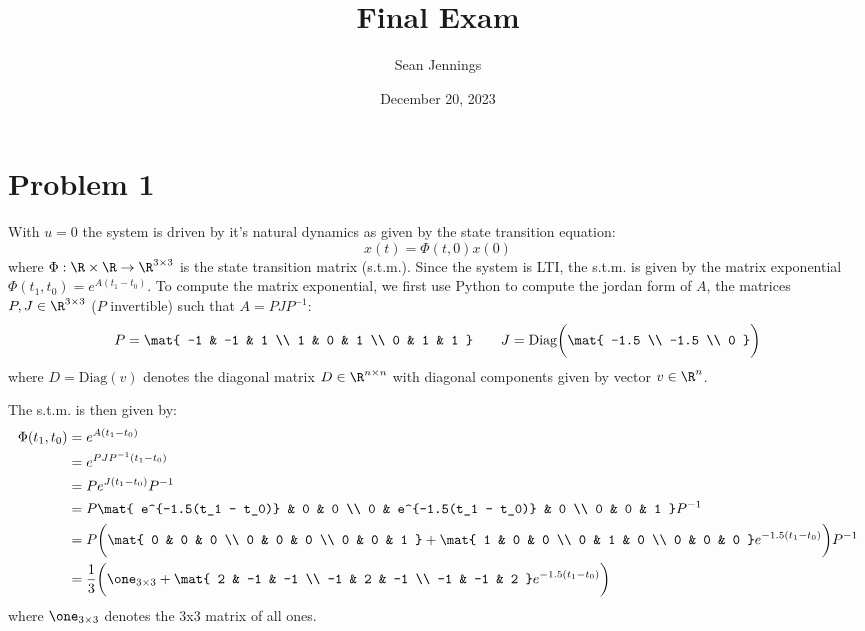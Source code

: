 \documentclass{homework}
\title{Final Exam}
\author{Sean Jennings}
\date{December 20, 2023}
\begin{document}
\maketitle
\newcommand{\control}{\mathcal{C}}

\section{Problem 1}
\begin{letterenum}
\item With $u=0$ the system is driven by it's natural dynamics as given by the state transition equation:
\begin{equation}
    x(t) = \Phi(t, 0) x(0)
    \label{eq:natural-dyn}
\end{equation}
where $\Phi: \R \times \R \to \R^{3 \times 3}$ is the state transition matrix (s.t.m.). Since the system
is LTI, the s.t.m. is given by the matrix exponential $\Phi(t_1, t_0) = e^{A(t_1 - t_0)}$. To compute
the matrix exponential, we first use Python to compute the jordan form of $A$, the matrices $P,J\in\R^{3\times 3}$
($P$ invertible) such that $A = PJP^{-1}$:
\begin{equation*}
    P = \mat{
        -1 & -1 & 1 \\
        1 & 0 & 1 \\
        0 & 1 & 1
    } \qquad J = \text{Diag}\biggl(\mat{
        -1.5 \\ -1.5 \\ 0
    }\biggr)
\end{equation*}
where $D = \text{Diag}(v)$ denotes the diagonal matrix $D\in\R^{n\times n}$
with diagonal components given by vector $v\in\R^n$.

The s.t.m. is then given by:
\begin{align}
    \Phi(t_1, t_0) &= e^{A(t_1 - t_0)} \\
        &= e^{PJP^{-1}(t_1 - t_0)} \\
        &= Pe^{J(t_1 - t_0)} P^{-1} \\
        &= P \mat{
            e^{-1.5(t_1 - t_0)} & 0 & 0 \\
            0 & e^{-1.5(t_1 - t_0)} & 0 \\
            0 & 0 & 1
        } P^{-1} \\
        &= P \biggl(
            \mat{
                0 & 0 & 0 \\
                0 & 0 & 0 \\
                0 & 0 & 1
            } + \mat{
                1 & 0 & 0 \\
                0 & 1 & 0 \\
                0 & 0 & 0
            } e^{-1.5(t_1 - t_0)}
        \biggr) P^{-1} \\
        &= \frac{1}{3} \biggl(
            \one_{3\times 3} + \mat{
                2 & -1 & -1 \\
                -1 & 2 & -1 \\
                -1 & -1 & 2
            } e^{-1.5(t_1 - t_0)}
        \biggr)
    \label{eq:stm}
\end{align}
where $\one_{3 \times 3}$ denotes the 3x3 matrix of all ones.


\end{letterenum}
\end{document}
